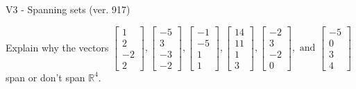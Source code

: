 \begin{exercise}
  \begin{exerciseTitle}V3 - Spanning sets (ver. 917)\end{exerciseTitle}
  \begin{exerciseStatement}
    Explain why the vectors \(\left[\begin{array}{r}
1 \\
2 \\
-2 \\
2
\end{array}\right] , \left[\begin{array}{r}
-5 \\
3 \\
-3 \\
-2
\end{array}\right] , \left[\begin{array}{r}
-1 \\
-5 \\
1 \\
1
\end{array}\right] , \left[\begin{array}{r}
14 \\
11 \\
1 \\
3
\end{array}\right] , \left[\begin{array}{r}
-2 \\
3 \\
-2 \\
0
\end{array}\right] , \text{ and } \left[\begin{array}{r}
-5 \\
0 \\
3 \\
4
\end{array}\right]\) span or don't span \(\mathbb{R}^4\). 
	



\end{exerciseStatement}
\end{exercise}
